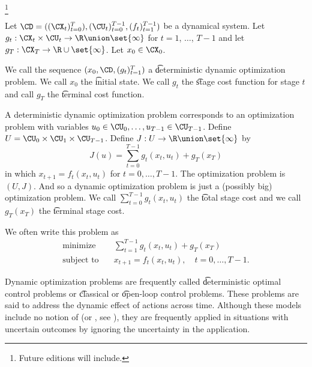 
\footnote{Future editions will include.}


Let $\CD = ((\CX_t)_{t = 0}^{T}), (\CU_t)_{t=0}^{T-1}, (f_t)_{t=1}^{T-1})$ be a dynamical system.
Let $g_t: \CX_t \times \CU_t \to \R \union \set{\infty}$ for $t = 1$, $\dots$, $T-1$ and let $g_{T}: \CX_T \to \R \cup \set{\infty}$.
Let $x_0 \in \CX_0$.

We call the sequence $(x_0, \CD, (g_t)_{t = 1}^{T})$ a \t{deterministic dynamic optimization problem}.
We call $x_0$ the \t{initial state}.
We call $g_t$ the \t{stage cost function} for stage $t$ and call $g_T$ the \t{terminal cost function}.

A deterministic dynamic optimization problem corresponds to an optimization problem with variables $u_0 \in \CU_0, \dots, u_{T-1} \in \CU_{T-1}$.
Define $U = \CU_0 \times \CU_1 \times \CU_{T-1}$.
Define $J: U \to \R \union \set{\infty}$ by
\[
    J(u) = \sum_{t = 0}^{T-1} g_t(x_t, u_t) + g_T(x_T)
\]
in which $x_{t+1} = f_t(x_t, u_t)$ for $t = 0, \dots, T-1$.
The optimization problem is $(U, J)$.
And so a dynamic optimization problem is just a (possibly big) optimization problem.
We call $\sum_{t = 0}^{T-1} g_t(x_t, u_t)$ the \t{total stage cost} and we call $g_T(x_T)$ the \t{terminal stage cost}.


We often write this problem as
\[
  \begin{aligned}
  \text{minimize}\quad & \sum_{t = 1}^{T-1} g_t(x_t, u_t) + g_T(x_T) \\
  \text{subject to}\quad & x_{t+1} = f_t(x_t, u_t), \quad t = 0, \dots, T-1.
  \end{aligned}
\]


Dynamic optimization problems are frequently called \t{deterministic optimal control} problems or \t{classical} or \t{open-loop control} problems.
These problems are said to address the dynamic effect of actions across time.
Although these models include no notion of  (or , see ), they are frequently applied in situations with uncertain outcomes by ignoring the uncertainty in the application.


